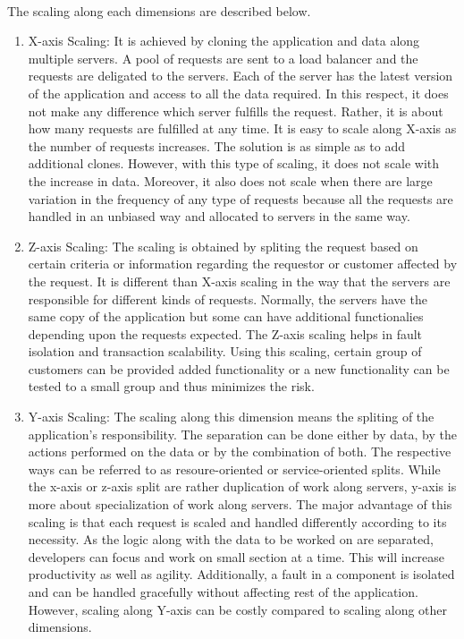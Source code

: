 \\
The scaling along each dimensions are described below. \cite{Fisher:2015aa}\cite{MacVittie:2014aa}\cite{Richardson:2014aa}
\begin{enumerate}
\item X-axis Scaling: It is achieved by cloning the application and data along multiple servers. A pool of requests are sent to a load balancer and the requests are deligated to the servers. Each of the server has the latest version of the application and access to all the data required. In this respect, it does not make any difference which server fulfills the request. Rather, it is about how many requests are fulfilled at any time. It is easy to scale along X-axis as the number of requests increases. The solution is as simple as to add additional clones. However, with this type of scaling, it does not scale with the increase in data. Moreover, it also does not scale when there are large variation in the frequency of any type of requests because all the requests are handled in an unbiased way and allocated to servers in the same way.
\\
\item Z-axis Scaling: The scaling is obtained by spliting the request based on certain criteria or information regarding the requestor or customer affected by the request. It is different than X-axis scaling in the way that the servers are responsible for different kinds of requests. Normally, the servers have the same copy of the application but some can have additional functionalies depending upon the requests expected. The Z-axis scaling helps in fault isolation and transaction scalability. Using this scaling, certain group of customers can be provided added functionality or a new functionality can be tested to a small group and thus minimizes the risk.
\\
\item Y-axis Scaling: The scaling along this dimension means the spliting of the application's responsibility. The separation can be done either by data, by the actions performed on the data or by the combination of both. The respective ways can be referred to as resoure-oriented or service-oriented splits. While the x-axis or z-axis split are rather duplication of work along servers, y-axis is more about specialization of work along servers. The major advantage of this scaling is that each request is scaled and handled differently according to its necessity. As the logic along with the data to be worked on are separated, developers can focus and work on small section at a time. This will increase productivity as well as agility. Additionally, a fault in a component is isolated and can be handled gracefully without affecting rest of the application. However, scaling along Y-axis can be costly compared to scaling along other dimensions.
\end{enumerate}
